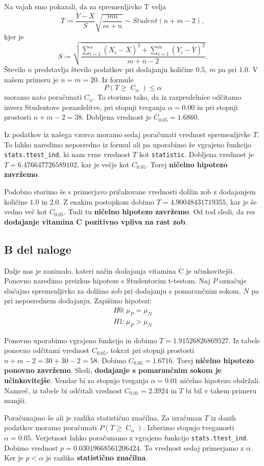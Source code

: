 \documentclass{article}
\DeclareMathOperator{\CM}{C}
\begin{document}
Na vajah smo pokazali, da za spremenljivko T velja
    \[
        T \coloneqq \frac{\overline{Y} - \overline{X}}{S}\sqrt{\frac{mn}{m + n}} \sim Student(n + m - 2),
    \]
    kjer je
    \[
        S \coloneqq \sqrt{\frac{\sum_{i = 1}^n (X_{i} - \overline{X})^2 + \sum_{i = 1}^m (Y_{i} - \overline{Y})^2}{m + n - 2}}.
    \]
Število $n$ predstavlja število podatkov pri dodajanju količine $0.5$, $m$ pa pri $1.0$. V našem primeru je $n=m=20$.
Iz formule
\[
        P(T \geq \CM_{\alpha}) \leq \alpha 
    \]
moramo nato poračunati $C_{\alpha}$. To storimo tako, da iz razpredelnice odčitamo inverz Studentove porazdelitve,
pri stopnji tveganja $\alpha = 0.00$ in pri stopnji prostosti $n + m -2 = 38$.
Dobljena vrednost je $C_{0.05} = 1.6860$.

Iz podatkov iz našega vzorca moramo sedaj poračunati vrednost spremenljivke $T$. To lahko naredimo 
neposredno iz formul ali pa uporabimo že vgrajeno funkcijo \texttt{stats.ttest\_ind},
ki nam vrne vrednost $T$ kot \texttt{statistic}. Dobljena vrednost je $T=6.476647726589102$, 
kar je večje kot $C_{0.05}$. Torej \textbf{ničelno hipotezo zavržemo}.

Podobno storimo še s primerjavo pričakovane vrednosti dolžin zob z dodajanjem količine $1.0$ in $2.0$.
Z enakim postopkom dobimo $T = 4.90048431719355$, kar je še vedno več kot $C_{0.05}$. Tudi tu \textbf{ničelno hipotezo 
zavržemo}. Od tod sledi, da res \textbf{dodajanje vitamina C pozitivno vpliva na rast zob}.


\subsection{B del naloge}
Dalje nas je zanimalo, kateri način dodajanja vitamina C je učinkovitejši. Ponovno naredimo preizkus hipoteze s
Studentovim t-testom.
Naj $P$ označuje slučajno spremenljivko za dolžino zob pri dodajanju s pomarančnim sokom, $N$ pa pri neposrednem dodajanju.
Zapišimo hipotezi:
\begin{align}
    H0: \mu_P = \mu_N \\
    H1: \mu_P > \mu_N
\end{align}

Ponovno uporabimo vgrajeno funkcijo in dobimo $T = 1.91526826869527$.
Iz tabele ponovno odčitami vrednost $C_{0.05}$, tokrat pri stopnji prostosti
$n + m - 2= 30 + 30 - 2 = 58$. Dobimo $C_{0.05} = 1.6716$. 
Torej \textbf{ničelno hipotezo ponovno zavržemo}. Sledi, \textbf{dodajanje s pomarančnim sokom je učinkovitejše}.
Vendar bi za stopnjo tveganja $\alpha=0.01$ ničelno hipotezo obdržali. Namreč, iz tabele bi 
odčitali vrednost $C_{0.01} = 2.3924$ in $T$ bi bil v takem primeru manjši.

Poračunajmo še ali je razlika statistično značilna. Za izračunan $T$ iz danih podatkov moramo 
poračunati $P(T \geq \CM_{\alpha})$. Izberimo stopnjo tveganosti $\alpha = 0.05$.
Verjetnost lahko poračunamo z vgrajeno funkcijo \texttt{stats.ttest\_ind}.
Dobimo vrednost $p=0.03019668561206424$. To vrednost sedaj primerjamo z $\alpha$. Ker je 
$p < \alpha$ je razlika \textbf{statistično značilna}.
\end{document}
